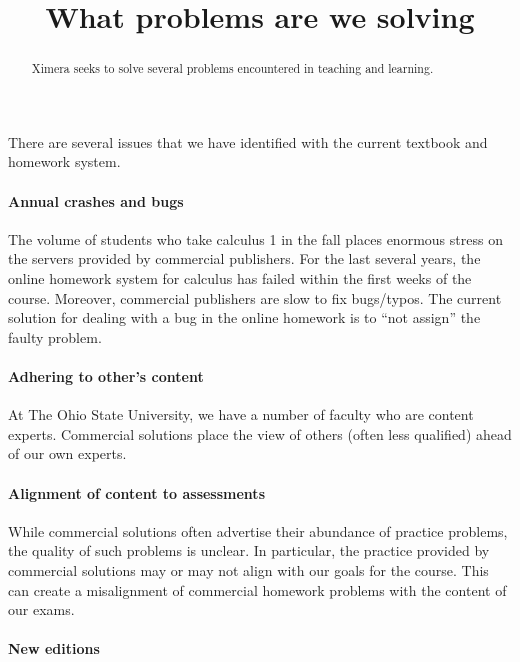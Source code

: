 \documentclass{ximera}
\title{What problems are we solving}
\begin{document}
\begin{abstract}
  Ximera seeks to solve several problems encountered in teaching and
  learning.
\end{abstract}
\maketitle

There are several issues that we have identified with the current
textbook and homework system.

\paragraph{Annual crashes and bugs}

The volume of students who take calculus 1 in the fall places enormous
stress on the servers provided by commercial publishers. For the last
several years, the online homework system for calculus has failed
within the first weeks of the course.  Moreover, commercial publishers
are slow to fix bugs/typos. The current solution for dealing with a
bug in the online homework is to ``not assign'' the faulty problem.


\paragraph{Adhering to other's content}

At The Ohio State University, we have a number of faculty who are
content experts. Commercial solutions place the view of others (often
less qualified) ahead of our own experts. 


\paragraph{Alignment of content to assessments}

While commercial solutions often advertise their abundance of practice
problems, the quality of such problems is unclear. In particular, the
practice provided by commercial solutions may or may not align with
our goals for the course. This can create a misalignment of commercial
homework problems with the content of our exams.


\paragraph{New editions}
\end{document}
